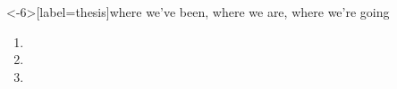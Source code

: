 \documentclass[presentation]{subfiles}
\begin{document}
\begin{frame}[standout]
\end{frame}


\begin{frame}<-6>[label=thesis]{\alert<2,6>{where we've been}, \alert<3,7>{where we are}, \alert<4,8>{where we're going}}
    
\begin{enumerate}
  \item<1,2,5,6> \firstthesis{}
  \item<1,3,5,7> \secondthesis{}
  \item<1,4,5,8> \thirdthesis{}
\end{enumerate}

\end{frame}
\end{document}
